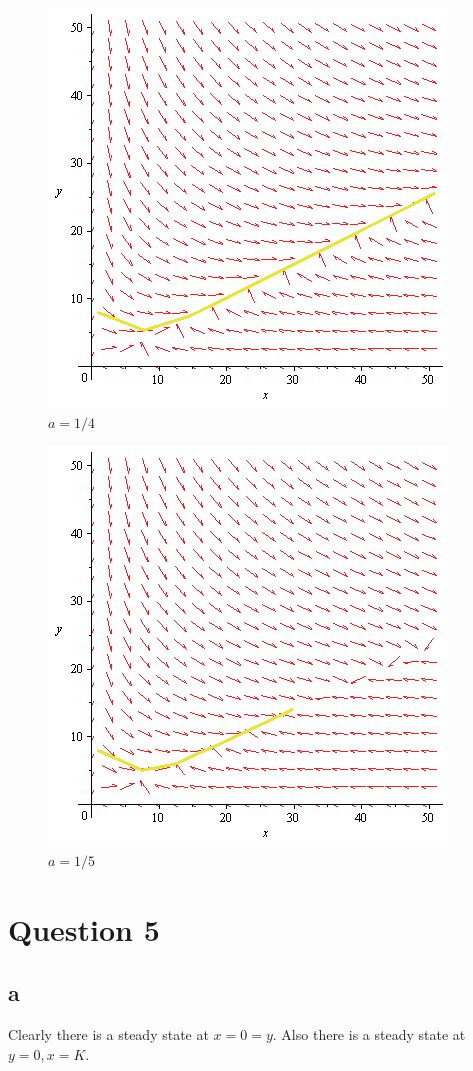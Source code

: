 \documentclass{unswmaths}
\begin{document}
\begin{figure}[H]
    \includegraphics[scale=0.3]{dir_field_1_4}
    \caption{$ a= 1 / 4 $}
\end{figure}

\begin{figure}[H]
    \includegraphics[scale=0.3]{dir_field_1_5}
    \caption{$ a= 1 / 5 $}
\end{figure}
\section*{Question 5}
\subsection*{a}
Clearly there is a steady state at $ x=0=y $.  Also there is a steady state at $ y = 0, x = K $. 
\end{document}
